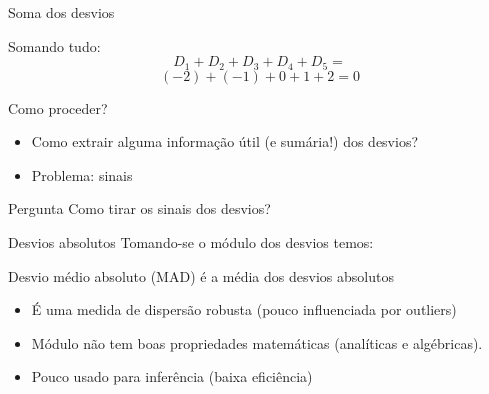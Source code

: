 \documentclass{beamer}
\begin{document}
\begin{frame}{Soma dos desvios}
  \begin{example}
    Somando tudo:
    \begin{displaymath}
    D_1 + D_2 + D_3 + D_4 + D_5 =
  \end{displaymath}
  \begin{displaymath}
    (-2) + (-1) + 0 + 1 + 2 = 0
  \end{displaymath}
  \end{example}
\end{frame}

\begin{frame}{Como proceder?}
  \begin{itemize}
  \item Como extrair alguma informação útil (e sumária!) dos desvios?
  \item Problema: sinais
  \end{itemize}
  \begin{block}{Pergunta}
    Como tirar os sinais dos desvios?
  \end{block}
\end{frame}

\begin{frame}{Desvios absolutos}
  Tomando-se o módulo dos desvios temos:

  \begin{definition}
    Desvio médio absoluto (MAD) é a média dos desvios absolutos
  \end{definition}

  \begin{itemize}
  \item É uma medida de dispersão robusta (pouco influenciada por
    outliers)
  \item Módulo não tem boas propriedades matemáticas (analíticas e
    algébricas).
  \item Pouco usado para inferência (baixa eficiência)
  \end{itemize}
\end{frame}
\end{document}
